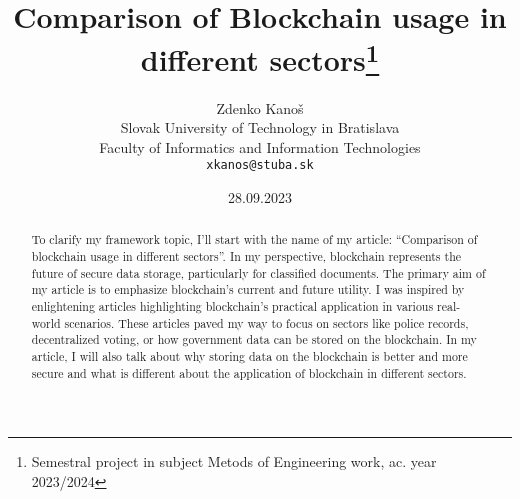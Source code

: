 \documentclass[10pt,twoside,english,a4paper]{article}
\title{Comparison of Blockchain usage in different sectors\thanks{Semestral project in subject Metods of Engineering work, ac. year 2023/2024}} %
\author{Zdenko Kanoš\\[2pt]
	{\small Slovak University of Technology in Bratislava}\\
	{\small Faculty of Informatics and Information Technologies}\\
	{\small \texttt{xkanos@stuba.sk}}
	}
\date{\small 28.09.2023} %
\begin{document}
\maketitle

\begin{abstract}
To clarify my framework topic, I'll start with the name of my article: “Comparison of
blockchain usage in different sectors”. In my perspective, blockchain represents the future
of secure data storage, particularly for classified documents. The primary aim of my article is
to emphasize blockchain’s current and future utility. I was inspired by enlightening articles
highlighting blockchain's practical application in various real-world scenarios. These articles
paved my way to focus on sectors like police records, decentralized voting, or how
government data can be stored on the blockchain. In my article, I will also talk about why
storing data on the blockchain is better and more secure and what is different about the
application of blockchain in different sectors.
\end{abstract}




\end{document}
